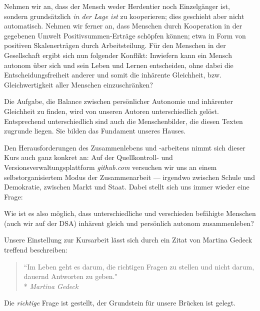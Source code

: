 Nehmen wir an, dass der Mensch weder Herdentier noch Einzelgänger ist, sondern grundsätzlich \emph{in der Lage ist} zu kooperieren; dies geschieht aber nicht automatisch.
Nehmen wir ferner an, dass Menschen durch Kooperation in der gegebenen Umwelt Positivsummen-Erträge schöpfen können; etwa in Form von positiven Skalenerträgen durch Arbeitsteilung.
Für den Menschen in der Gesellschaft ergibt sich nun folgender Konflikt:
Inwiefern kann ein Mensch autonom über sich und sein Leben und Lernen entscheiden, ohne dabei die Entscheidungsfreiheit anderer und somit die inhärente Gleichheit, bzw. Gleichwertigkeit aller Menschen einzuschränken?

Die Aufgabe, die Balance zwischen persönlicher Autonomie und inhärenter Gleichheit zu finden, wird von unseren Autoren unterschiedlich gelöst.
Entsprechend unterschiedlich sind auch die Menschenbilder, die diesen Texten zugrunde liegen.
Sie bilden das Fundament unseres Hauses.

Den Herausforderungen des Zusammenlebens und -arbeitens nimmt sich dieser Kurs auch ganz konkret an:
Auf der Quellkontroll- und Versionsverwaltungsplattform \emph{github.com} versuchen wir uns an einem selbstorganisiertem Modus der Zusammenarbeit --- irgendwo zwischen Schule und Demokratie, zwischen Markt und Staat.
Dabei stellt sich uns immer wieder eine Frage:

Wie ist es also möglich, dass unterschiedliche und verschieden befähigte Menschen (auch wir auf der DSA) inhärent gleich und persönlich autonom zusammenleben?

Unsere Einstellung zur Kursarbeit lässt sich durch ein Zitat von Martina Gedeck treffend beschreiben:

\begin{quote}
	``Im Leben geht es darum, die richtigen Fragen zu stellen und nicht darum, dauernd Antworten zu geben."\\*
	\emph{Martina Gedeck}
\end{quote}

Die \emph{richtige} Frage ist gestellt, der Grundstein für unsere Brücken ist gelegt.